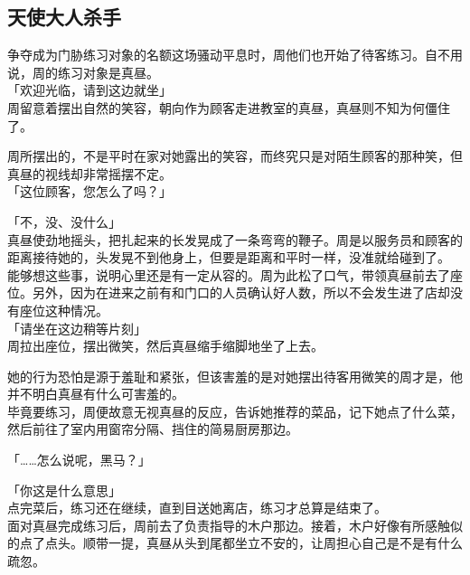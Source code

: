 \subsection{天使大人杀手}

争夺成为门胁练习对象的名额这场骚动平息时，周他们也开始了待客练习。自不用说，周的练习对象是真昼。\\

「欢迎光临，请到这边就坐」\\

周留意着摆出自然的笑容，朝向作为顾客走进教室的真昼，真昼则不知为何僵住了。

周所摆出的，不是平时在家对她露出的笑容，而终究只是对陌生顾客的那种笑，但真昼的视线却非常摇摆不定。\\

「这位顾客，您怎么了吗？」

「不，没、没什么」\\

真昼使劲地摇头，把扎起来的长发晃成了一条弯弯的鞭子。周是以服务员和顾客的距离接待她的，头发晃不到他身上，但要是距离和平时一样，没准就给碰到了。\\

能够想这些事，说明心里还是有一定从容的。周为此松了口气，带领真昼前去了座位。另外，因为在进来之前有和门口的人员确认好人数，所以不会发生进了店却没有座位这种情况。\\

「请坐在这边稍等片刻」\\

周拉出座位，摆出微笑，然后真昼缩手缩脚地坐了上去。

她的行为恐怕是源于羞耻和紧张，但该害羞的是对她摆出待客用微笑的周才是，他并不明白真昼有什么可害羞的。\\

毕竟要练习，周便故意无视真昼的反应，告诉她推荐的菜品，记下她点了什么菜，然后前往了室内用窗帘分隔、挡住的简易厨房那边。\\

\vspace{2\baselineskip}

「……怎么说呢，黑马？」

「你这是什么意思」\\

点完菜后，练习还在继续，直到目送她离店，练习才总算是结束了。\\

面对真昼完成练习后，周前去了负责指导的木户那边。接着，木户好像有所感触似的点了点头。顺带一提，真昼从头到尾都坐立不安的，让周担心自己是不是有什么疏忽。\\


